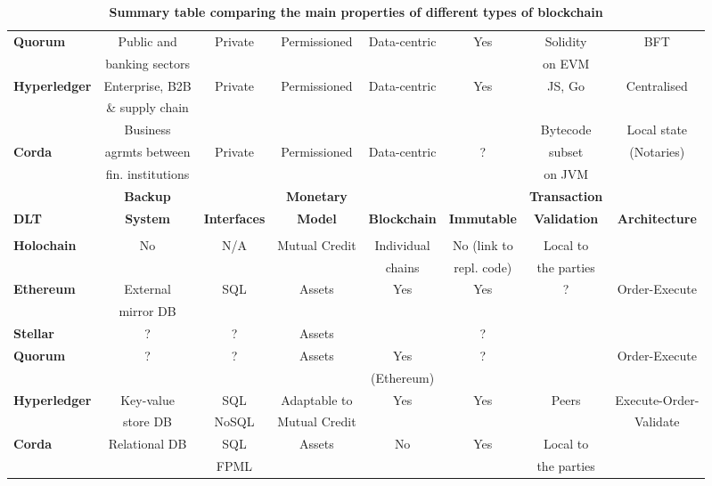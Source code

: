 \begin{table}
\begin{centering}
{\begin{tabular}{| l | c | c | c | c | c | c | c |}
\textbf{Quorum} 	&Public and  			&Private		&Permissioned		&Data-centric	&Yes		&Solidity
				&BFT 				\\
			 	&banking sectors		&			&				&			&		&on EVM
				& 					\\
\hline
\textbf{Hyperledger}	&Enterprise, B2B		&Private		&Permissioned		&Data-centric	&Yes		&JS, Go
				&Centralised 			\\
 				& \& supply chain		&			&				&			&		&
				& 					\\
\hline
				&Business	 		&			&				&			&		&Bytecode
				&Local state			\\
\textbf{Corda} 		&agrmts between			&Private		&Permissioned		&Data-centric	&?		&subset
				&(Notaries)			\\
		 		&fin. institutions			&			&				&			&		&on JVM
				&					\\
\hline
\hline
\hline
\hline
				& \textbf{Backup} 		& \textbf{}				&\textbf{Monetary}
				& \textbf{}  			& \textbf{}  			& \textbf{Transaction} 	& \\
\textbf{DLT}		& \textbf{System} 		& \textbf{Interfaces}		&\textbf{Model} 
				& \textbf{Blockchain} 	& \textbf{Immutable} 		& \textbf{Validation} 		& \textbf{Architecture} \\
				& \textbf{} 				& \textbf{}				&\textbf{}
				& \textbf{} 				& \textbf{} 				& \textbf{} 				&\\
\hline
\hline
\textbf{Holochain}	&No			&N/A				&Mutual Credit
				&Individual	&No (link to				&Local to	& \\
				&			&				& 
				&chains 		&repl. code)				&the parties		& \\
\hline
\textbf{Ethereum}	&External		&SQL			&Assets 
				&Yes			&Yes				&?		&Order-Execute \\
				&mirror DB			&				& 
				& 			&				&				& \\
\hline

\textbf{Stellar}		&?			&?				&Assets
				&			&?				&				&\\
\hline
\textbf{Quorum} 	&?			&?				&Assets
				&Yes			&?				&				&Order-Execute\\
			 	&			&				&
				&(Ethereum) 	&				&				& \\
\hline
\textbf{Hyperledger}	&Key-value	&SQL		&Adaptable to
				&Yes			&Yes				&Peers			&Execute-Order-\\
 				&store DB		&NoSQL			&Mutual Credit
				&			&				&				&Validate \\
\hline
\textbf{Corda} 		&Relational DB	&SQL			&Assets
				&No			&Yes				&Local to	& \\
		 		&			&FPML			&
				& 			&				&the parties		& \\
\hline
\end{tabular}}
\caption{\bf \small Summary table comparing the main properties of different types of blockchain}
\label{blockchain_types1}
\end{centering}
\end{table}


